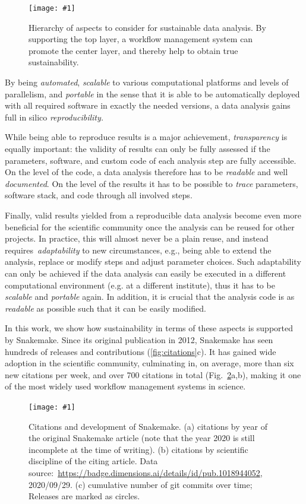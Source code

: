 \documentclass[parskip=half]{scrartcl}
\newcommand{\image}[1]{\centering\texttt{[image: \#1]}}
\let\plainurl\url
\renewcommand{\url}[1]{\protect\plainurl{#1}}
\begin{document}
\begin{figure}
	\image{sustainability-in-wms.pdf}
	\caption{
		Hierarchy of aspects to consider for sustainable data analysis.
		By supporting the top layer, a workflow management system can promote the center layer, and thereby help to obtain true sustainability.
	}\label{fig:sustainability}
\end{figure}

By being \emph{automated}, \emph{scalable} to various computational platforms and levels of parallelism, and \emph{portable} in the sense that it is able to be automatically deployed with all required software in exactly the needed versions, a data analysis gains full in silico \emph{reproducibility.}

While being able to reproduce results is a major achievement, \emph{transparency} is equally important: the validity of results can only be fully assessed if the parameters, software, and custom code of each analysis step are fully accessible.
On the level of the code, a data analysis therefore has to be \emph{readable} and well \emph{documented}.
On the level of the results it has to be possible to \emph{trace} parameters, software stack, and code through all involved steps.

Finally, valid results yielded from a reproducible data analysis become even more beneficial for the scientific community once the analysis can be reused for other projects.
In practice, this will almost never be a plain reuse, and instead requires~\emph{adaptability} to new circumstances, e.g., being able to extend the analysis, replace or modify steps and adjust parameter choices.
Such adaptability can only be achieved if the data analysis can easily be executed in a different computational environment (e.g. at a different institute), thus it has to be \emph{scalable} and \emph{portable} again.
In addition, it is crucial that the analysis code is as \emph{readable} as possible such that it can be easily modified.

In this work, we show how sustainability in terms of these aspects is supported by Snakemake.
Since its original publication in 2012, Snakemake has seen hundreds of releases and contributions (\autoref{fig:citations}c).
It has gained wide adoption in the scientific community, culminating in, on average, more than six new citations per week, and over 700 citations in total (Fig.~\ref{fig:citations}a,b), making it one of the most widely used workflow management systems in science.

\begin{figure}
	\image{citations+development.pdf}
	\caption{
		Citations and development of Snakemake.
		(a) citations by year of the original Snakemake article (note that the year 2020 is still incomplete at the time of writing).
		(b) citations by scientific discipline of the citing article.
		Data source:~\url{https://badge.dimensions.ai/details/id/pub.1018944052}, 2020/09/29.
		(c) cumulative number of git commits over time; Releases are marked as circles.
	}
	\label{fig:citations}
\end{figure}
\end{document}
